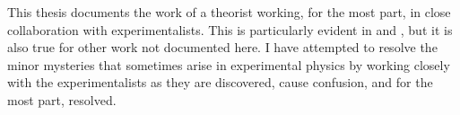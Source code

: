 \parasep

This thesis documents the work of a theorist working, for the most part, in close collaboration with experimentalists.  This is particularly evident in  and , but it is also true for other work not documented here.  I have attempted to resolve the minor mysteries that sometimes arise in experimental physics by working closely with the experimentalists as they are discovered, cause confusion, and for the most part, resolved.






